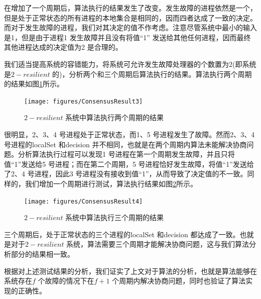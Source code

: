     在增加了一个周期后，算法执行的结果发生了改变。发生故障的进程依然是一个，但是处于正常状态的所有进程的本地集合是相同的，因而四者达成了一致的决定。而对于发生故障的进程，我们对其决定的值不作考虑。注意尽管系统中最小的输入是1，但是由于进程1 发生故障并且没有将值“1” 发送给其他任何进程，因而最终其他进程达成的决定值为2 是合理的。

    我们适当提高系统的容错能力，将系统可允许发生故障处理器的个数置为$2$(即系统是$2-resilient$ 的)，分析两个和三个周期后算法执行的结果。算法执行两个周期的结果如图\ref{ConsensusResult3}所示。
    \begin{figure}[ht]
        \centering
        \texttt{[image: figures/ConsensusResult3]}\\
        \caption{$2-resilient$ 系统中算法执行两个周期的结果}\label{ConsensusResult3}
    \end{figure}

    很明显，2、3、4 号进程处于正常状态，而1、5 号进程发生了故障。然而2、3、4 号进程的localSet 和decision 并不相同，也就是在两个周期内算法未能解决协商问题。分析算法执行过程可以发现1 号进程在第一个周期发生故障，并且只将值“1”发送给5 号进程；而在第二个周期，5 号进程恰好发生故障，将值“1”发送给了2、4 号进程，因此3 号进程没有接收到值“1”，从而导致了决定值的不一致。同样的，我们增加一个周期进行测试，算法执行结果如图\ref{ConsensusResult4}所示。
    \begin{figure}[ht]
        \centering
        \texttt{[image: figures/ConsensusResult4]}\\
        \caption{$2-resilient$ 系统中算法执行三个周期的结果}\label{ConsensusResult4}
    \end{figure}

    三个周期后，处于正常状态的三个进程的localSet 和decision 都达成了一致。也就是对于$2-resilient$ 系统，算法需要三个周期才能解决协商问题，这与我们算法分析部分的结果相一致。

    根据对上述测试结果的分析，我们证实了上文对于算法的分析，也就是算法能够在系统存在$f$ 个故障的情况下在$f+1$ 个周期内解决协商问题，同时也验证了算法实现的正确性。

